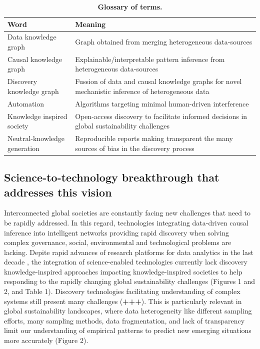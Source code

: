 \documentclass[11pt, a4paper]{article} %
\begin{document}
   
\begin{table}[ht]
\begin{tabular}{ p{6cm} | p{11cm}}
  \hline \hline
  \textbf{Word} &\textbf{Meaning}\\  \hline
  Data knowledge graph & Graph obtained from merging heterogeneous data-sources \\ \hline
  Causal knowledge graph & Explainable/interpretable pattern inference from heterogeneous data-sources \\ \hline
  Discovery knowledge graph & Fussion of data and causal knowledge graphs for novel mechanistic inference of heterogeneous data\\ \hline
  Automation & Algorithms targeting minimal human-driven interference\\ \hline
  Knowledge inspired society & Open-access discovery to facilitate informed decisions in global sustainability challenges \\ \hline
  Neutral-knowledge generation & Reproducible reports making transparent the many sources of bias in the discovery process\\ \hline
  \bottomrule
\end{tabular}
\caption{{\bf Glossary of terms.}}
\end{table}

\subsection{Science-to-technology breakthrough that addresses this vision}

Interconnected global societies are constantly facing new challenges
that need to be rapidly addressed. In this regard, technologies
integrating data-driven causal inference into intelligent networks
providing rapid discovery when solving complex governance, social,
environmental and technological problems are lacking. Depite rapid
advances of research platforms for data analytics in the last decade
\citep{Melniketal:2010,Steinruecken,Modulos,Guimera2020,GoogleAI,IrisAI,easeml,datarobot,aito},
the integration of science-enabled technologies currently lack
discovery knowledge-inspired approaches impacting knowledge-inspired
societies to help responding to the rapidly changing global
sustainability challenges (Figures 1 and 2, and Table 1). Discovery
technologies facilitating understanding of complex systems still
present many challenges ({\bf +++}). This is particularly relevant in
global sustainability landscapes, where data heterogeneity like
different sampling efforts, many sampling methods, data fragmentation,
and lack of transparency limit our understanding of empirical patterns
to predict new emerging situations more accurately (Figure 2).
\end{document}
